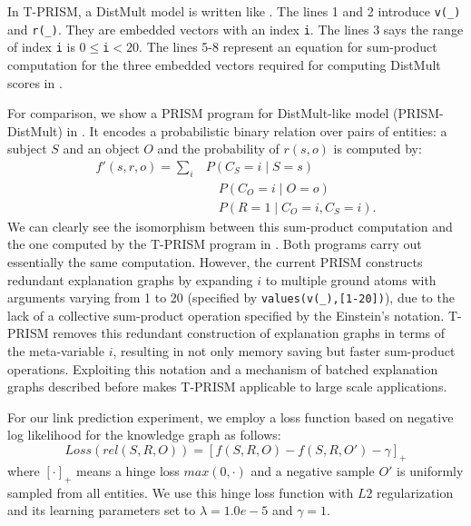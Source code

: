 \documentclass[a4paper]{report}
\begin{document}
In      T-PRISM,      a       DistMult      model      is      written
like   .     The   lines   1    and   2
introduce \verb|v(_)| and \verb|r(_)|.  They are embedded vectors with
an index  \verb|i|. The lines  3 says the  range of index  \verb|i| is
$0  \leq $\verb|i|$<  20$.  The  lines 5-8  represent an  equation for
sum-product computation  for the  three embedded vectors  required for
computing DistMult scores in .



For  comparison, we  show  a PRISM  program  for DistMult-like  model
(PRISM-DistMult)
in  \cite{kojima2018ijar}.  It encodes a
probabilistic binary  relation over pairs  of entities: a  subject $S$
and an object $O$ and the probability of $r(s,o)$ is computed by:
\begin{align}\nonumber
f'(s,r,o)=\sum_i & P(C_S=i \mid S=s) \\ \nonumber
&\hspace{1em} P(C_O=i \mid O=o) \\
&\hspace{1em} P(R=1 \mid C_O=i, C_S=i).
\label{eq:prism-distmult}
\end{align}
%
We can clearly see the isomorphism between this sum-product computation and the
one computed by the T-PRISM program in
.
Both programs carry out essentially the same computation. However, the
current PRISM constructs redundant explanation graphs by expanding $i$
to  multiple  ground  atoms  with  arguments  varying  from  1  to  20
(specified  by  {\tt values(v(\_),[1-20])}),  due  to  the lack  of  a
collective sum-product operation specified by the Einstein's notation.
T-PRISM removes  this redundant construction of  explanation graphs in
terms of  the meta-variable $i$,  resulting in not only  memory saving
but  faster sum-product  operations.  Exploiting  this notation  and a
mechanism of batched explanation graphs described before makes T-PRISM
applicable to large scale applications.



For our link prediction experiment, we employ a loss function based on
negative log likelihood for the knowledge graph as follows:
%
\[Loss(rel(S,R,O)) = \left[ f(S, R, O) - f(S, R, O') -\gamma \right]_{+}\]
%
where $[\cdot]_{+}$ means  a hinge loss $max(0,\cdot)$  and a negative
sample  $O'$ is  uniformly sampled  from all  entities.  We  use this
hinge  loss  function  with   $L2$  regularization  and  its  learning
parameters set to $\lambda=1.0e-5$ and $\gamma=1$.
\end{document}
